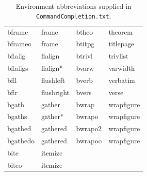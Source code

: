 \documentclass[11pt]{article}
\newcommand{\CCT}{\texttt{CommandCompletion.txt}}
\begin{document}
\begin{table}
\begin{tabular}{llll}
bframe    & frame       & btheo   & theorem \\
bframeo   & frame       & btitpg  & titlepage \\
bflalig   & flalign     & btrivl  & trivlist \\
bflaligs  & flalign*    & bvarw   & varwidth \\
bfll      & flushleft   & bverb   & verbatim \\
bflr      & flushright  & bvers   & verse \\
bgath     & gather      & bwrap   & wrapfigure \\
bgaths    & gather*     & bwrapo  & wrapfigure \\
bgathed   & gathered    & bwrapo2 & wrapfigure \\
bgathedo  & gathered    & bwrapoo & wrapfigure \\
bite      & itemize     &         & \\
biteo     & itemize     &         & \\
\end{tabular}
\caption{Environment abbreviations supplied in \CCT.}
\label{tbl:environments}
\end{table}
\end{document}
